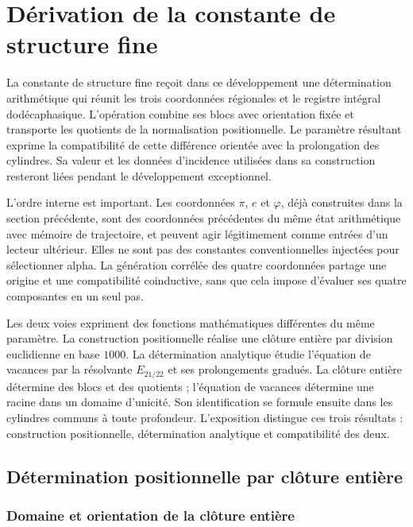 \section{Dérivation de la constante de structure fine}
\label{sec:alpha}

La constante de structure fine reçoit dans ce développement une détermination arithmétique qui réunit les trois coordonnées régionales et le registre intégral dodécaphasique. L'opération combine ses blocs avec orientation fixée et transporte les quotients de la normalisation positionnelle. Le paramètre résultant exprime la compatibilité de cette différence orientée avec la prolongation des cylindres. Sa valeur et les données d'incidence utilisées dans sa construction resteront liées pendant le développement exceptionnel.

L'ordre interne est important. Les coordonnées \(\pi\), \(e\) et \(\varphi\), déjà construites dans la section précédente, sont des coordonnées
précédentes du même état arithmétique avec mémoire de trajectoire, et peuvent agir légitimement comme
entrées d'un lecteur ultérieur. Elles ne sont pas des constantes conventionnelles
injectées pour sélectionner alpha. La génération corrélée des quatre coordonnées partage une origine et
une compatibilité coinductive, sans que cela impose d'évaluer ses quatre
composantes en un seul pas.

Les deux voies expriment des fonctions mathématiques différentes du même paramètre.  
La construction positionnelle réalise une clôture entière par division euclidienne en base  
\(1000\). La détermination analytique étudie l'équation de vacances par  
la résolvante \(E_{21/22}\) et ses prolongements gradués. La clôture entière  
détermine des blocs et des quotients ; l'équation de vacances détermine une racine dans un  
domaine d'unicité. Son identification se formule ensuite  
dans les cylindres communs à toute profondeur. L'exposition distingue  
ces trois résultats : construction positionnelle, détermination analytique  
et compatibilité des deux.

\subsection{Détermination positionnelle par clôture entière}
\subsubsection{Domaine et orientation de la clôture entière}
\label{subsec:alpha-dominio}

